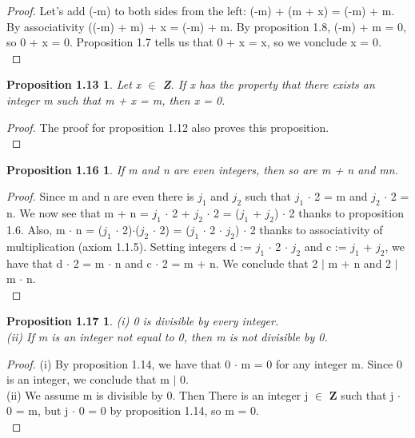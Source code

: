 \documentclass[12pt]{amsart}
\begin{document}
\begin{proof}
	Let's add (-m) to both sides from the left: (-m) + (m + x) = (-m) + m. By associativity ((-m) + m) + x = (-m) + m. By proposition 1.8, (-m) + m = 0, so 0 + x = 0. Proposition 1.7 tells us that 0 + x = x, so we vonclude x = 0.
	\\
\end{proof}

\newtheorem*{prop1.13}{Proposition 1.13}
\begin{prop1.13}
	Let x $\in$ \textbf{Z}. If x has the property that there exists an integer m such that m + x = m,
then x = 0.
\end{prop1.13}

\begin{proof}
	The proof for proposition 1.12 also proves this proposition.
	\\
\end{proof}

\newtheorem*{prop1.16}{Proposition 1.16}
\begin{prop1.16}
	If m and n are even integers, then so are m + n and mn.
\end{prop1.16}

\begin{proof}
	Since m and n are even there is $j_{1}$ and $j_{2}$ such that $j_{1}$ $\cdot$ 2 = m and $j_{2}$ $\cdot$ 2 = n. We now see that m + n = $j_{1}$ $\cdot$ 2 + $j_{2}$ $\cdot$ 2 = ($j_{1}$ + $j_{2}$) $\cdot$ 2 thanks to proposition 1.6. Also, m $\cdot$ n = ($j_{1}$ $\cdot$ 2)$\cdot$($j_{2}$ $\cdot$ 2) = ($j_{1}$ $\cdot$ 2 $\cdot$ $j_{2}$) $\cdot$ 2 thanks to associativity of multiplication (axiom 1.1.5). Setting integers d := $j_{1}$ $\cdot$ 2 $\cdot$ $j_{2}$ and c := $j_{1}$ + $j_{2}$, we have that d $\cdot$ 2 = m $\cdot$ n and c $\cdot$ 2 = m + n. We conclude that 2 $\mid$ m + n and 2 $\mid$ m $\cdot$ n.
	\\
\end{proof}

\newtheorem*{prop1.17}{Proposition 1.17}
\begin{prop1.17}
    (i) 0 is divisible by every integer.
	\\(ii) If m is an integer not equal to 0, then m is not divisible by 0.
\end{prop1.17}

\begin{proof}
	(i) By proposition 1.14, we have that 0 $\cdot$ m = 0 for any integer m. Since 0 is an integer, we conclude that m $\mid$ 0.
	\\
	\indent(ii) We assume m is divisible by 0. Then There is an integer j $\in$ \textbf{Z} such that j $\cdot$ 0 = m, but j $\cdot$ 0 = 0 by proposition 1.14, so m = 0.
	\\
\end{proof}
\end{document}

